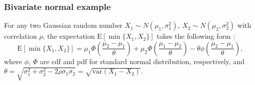 \documentclass[opre,sglanonrev]{informs4}
\begin{document}
\subsubsection{Bivariate normal example}
\label{bivariate normal}


For any two Gaussian random number $X_1\sim N(\mu_1,\sigma^2_1)$, $X_2\sim N(\mu_2,\sigma^2_2)$ with correlation $\rho$, the expectation $\text{E}[\min\{X_1, X_2\}]$ takes the following form \citep{clark1961greatest}:
$$
\text{E}[\min\{X_1, X_2\}] = \mu_1\Phi(\frac{\mu_2-\mu_1}{\theta}) + \mu_2\Phi(\frac{\mu_1-\mu_2}{\theta}) - \theta \phi(\frac{\mu_2-\mu_1}{\theta} ),
$$
where $\phi$, $\Phi$ are cdf and pdf for standard normal distribution, respectively, and $\theta = \sqrt{\sigma^2_1+\sigma^2_2-2\rho \sigma_1\sigma_2} = \sqrt{\text{var}(X_1-X_2)}$.

%
%
\end{document}
